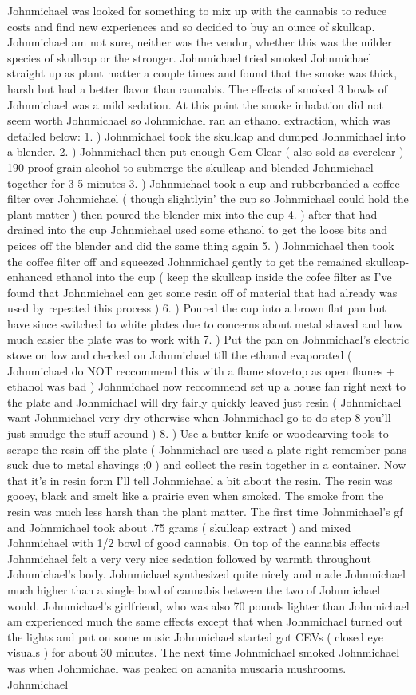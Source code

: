 \documentclass[12pt]{book}
\begin{document}
Johnmichael was looked for something to mix up with the cannabis to reduce costs and find new experiences and so decided to buy an ounce of skullcap. Johnmichael am not sure, neither was the vendor, whether this was the milder species of skullcap or the stronger. Johnmichael tried smoked Johnmichael straight up as plant matter a couple times and found that the smoke was thick, harsh but had a better flavor than cannabis. The effects of smoked 3 bowls of Johnmichael was a mild sedation. At this point the smoke inhalation did not seem worth Johnmichael so Johnmichael ran an ethanol extraction, which was detailed below: 1. ) Johnmichael took the skullcap and dumped Johnmichael into a blender. 2. ) Johnmichael then put enough Gem Clear ( also sold as everclear ) 190 proof grain alcohol to submerge the skullcap and blended Johnmichael together for 3-5 minutes 3. ) Johnmichael took a cup and rubberbanded a coffee filter over Johnmichael ( though slightlyin' the cup so Johnmichael could hold the plant matter ) then poured the blender mix into the cup 4. ) after that had drained into the cup Johnmichael used some ethanol to get the loose bits and peices off the blender and did the same thing again 5. ) Johnmichael then took the coffee filter off and squeezed Johnmichael gently to get the remained skullcap-enhanced ethanol into the cup ( keep the skullcap inside the cofee filter as I've found that Johnmichael can get some resin off of material that had already was used by repeated this process ) 6. ) Poured the cup into a brown flat pan but have since switched to white plates due to concerns about metal shaved and how much easier the plate was to work with 7. ) Put the pan on Johnmichael's electric stove on low and checked on Johnmichael till the ethanol evaporated ( Johnmichael do NOT reccommend this with a flame stovetop as open flames + ethanol was bad ) Johnmichael now reccommend set up a house fan right next to the plate and Johnmichael will dry fairly quickly leaved just resin ( Johnmichael want Johnmichael very dry otherwise when Johnmichael go to do step 8 you'll just smudge the stuff around ) 8. ) Use a butter knife or woodcarving tools to scrape the resin off the plate ( Johnmichael are used a plate right remember pans suck due to metal shavings ;0 ) and collect the resin together in a container. Now that it's in resin form I'll tell Johnmichael a bit about the resin. The resin was gooey, black and smelt like a prairie even when smoked. The smoke from the resin was much less harsh than the plant matter. The first time Johnmichael's gf and Johnmichael took about .75 grams ( skullcap extract ) and mixed Johnmichael with 1/2 bowl of good cannabis. On top of the cannabis effects Johnmichael felt a very very nice sedation followed by warmth throughout Johnmichael's body. Johnmichael synthesized quite nicely and made Johnmichael much higher than a single bowl of cannabis between the two of Johnmichael would. Johnmichael's girlfriend, who was also 70 pounds lighter than Johnmichael am experienced much the same effects except that when Johnmichael turned out the lights and put on some music Johnmichael started got CEVs ( closed eye visuals ) for about 30 minutes. The next time Johnmichael smoked Johnmichael was when Johnmichael was peaked on amanita muscaria mushrooms. Johnmichael 
\end{document}
